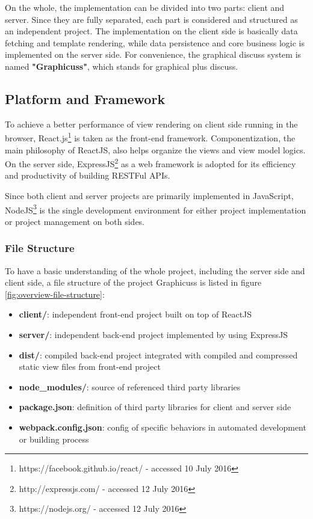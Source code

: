 On the whole, the implementation can be divided into two parts: client and server. Since they are fully separated, each part is considered and structured as an independent project. The implementation on the client side is basically data fetching and template rendering, while data persistence and core business logic is implemented on the server side.  For convenience, the graphical discuss system is named \textbf{"Graphicuss"}, which stands for graphical plus discuss.


\subsection{Platform and Framework}
To achieve a better performance of view rendering on client side running in the browser, React.js\footnote{https://facebook.github.io/react/ - accessed 10 July 2016} is taken as the front-end framework. Componentization, the main philosophy of ReactJS, also helps organize the views and view model logics. On the server side, ExpressJS\footnote{http://expressjs.com/ - accessed 12 July 2016} as a web framework is adopted for its efficiency and productivity of building RESTFul APIs.

Since both client and server projects are primarily implemented in JavaScript, NodeJS\footnote{https://nodejs.org/ - accessed 12 July 2016} is the single development environment for either project implementation or project management on both sides.

\subsubsection{File Structure}

To have a basic understanding of the whole project, including the server side and client side, a file structure of the project Graphicuss is listed in figure \ref{fig:overview-file-structure}:

\begin{itemize}
\item 
  \textbf{client/}: independent front-end project built on top of ReactJS
\item
  \textbf{server/}: independent back-end project implemented by using ExpressJS
\item
  \textbf{dist/}: compiled back-end project integrated with compiled and compressed static view files from front-end project
\item 
  \textbf{node\_modules/}: source of referenced third party libraries
\item 
  \textbf{package.json}: definition of third party libraries for client and server side
\item 
  \textbf{webpack.config.json}: config of specific behaviors in automated development or building process
\end{itemize}

